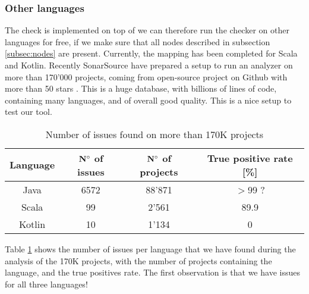 \subsubsection{Other languages}
\label{subsubsec:other_languages}
The check is implemented on top of \slang{} we can therefore run the checker on other languages for free, if we make sure that all nodes described in subsection \ref{subsec:nodes} are present. 
Currently, the mapping has been completed for Scala and Kotlin.
Recently SonarSource have prepared a setup to run an analyzer on more than 170'000 projects, coming from open-source project on Github with more than 50 stars \cite{sourced:2019:Online}. 
This is a huge database, with billions of lines of code, containing many languages, and of overall good quality. 
This is a nice setup to test our tool.

\begin{table}[h]
	\centering
	\caption{Number of issues found on more than 170K projects}
	\label{table:large_scale_issues}
	\begin{tabular}{|c|c|c|c|}
		\hline
		\bf Language & \bf $\bf N^{\circ}$ of issues & \bf $\bf N^{\circ}$  of projects & \bf True positive rate [\%] \\ \hline
		Java & 6572 & 88'871 & $>$99 ? \\
		Scala & 99 & 2'561 & 89.9 \\
		Kotlin & 10 & 1'134 & 0 \\ \hline
	\end{tabular}
\end{table}

Table \ref{table:large_scale_issues} shows the number of issues per language that we have found during the analysis of the 170K projects, with the number of projects containing the language, and the true positives rate.
The first observation is that we have issues for all three languages!

